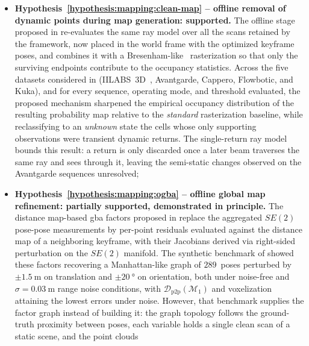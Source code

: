 \begin{itemize}
scan mode and from $89$ to $18$ nodes in local map mode once relocalization
is enabled. These results confirm that the back-end size follows the spatial
extent of the explored environment rather than the duration of the operation
or the path length;
\item \textbf{Hypothesis~\ref{hypothesis:mapping:clean-map} --
offline removal of dynamic points during map generation: supported.}
The offline stage proposed in  re-evaluates
the same ray model over all the scans retained by the framework, now placed
in the world frame with the optimized keyframe poses, and combines it with a
Bresenham-like~\cite{bresenham:ibm:1965,zingl:uas:2016} rasterization so that
only the surviving endpoints contribute to the occupancy statistics.
Across the five datasets considered in 
(IILABS~3D~\cite{ribeiro:access:2025}, Avantgarde, Cappero, Flowbotic, and
Kuka), and for every sequence, operating mode, and threshold evaluated, the
proposed mechanism sharpened the empirical occupancy distribution of the
resulting probability map relative to the \emph{standard} rasterization
baseline, while reclassifying to an \emph{unknown} state the cells whose only
supporting observations were transient dynamic returns.
The single-return ray model bounds this result: a return is only discarded
once a later beam traverses the same ray and sees through it, leaving the
semi-static changes observed on the Avantgarde sequences unresolved;
\item \textbf{Hypothesis~\ref{hypothesis:mapping:ogba} --
offline global map refinement: partially supported, demonstrated in
principle.}
The distance map-based \gls{gba} factors proposed in 
replace the aggregated $SE(2)$ pose-pose measurements by per-point residuals
evaluated against the distance map of a neighboring keyframe, with their
Jacobians derived via right-sided perturbation on the $SE(2)$ manifold.
The synthetic benchmark of  showed these factors
recovering a Manhattan-like graph of $289$~poses perturbed by
$\pm\SI{1.5}{\metre}$ on translation and $\pm\SI{20}{\degree}$ on
orientation, both under noise-free and $\sigma = \SI{0.03}{\metre}$ range
noise conditions, with $\mathcal{D}_\mathrm{p2p}(\mathcal{M}_1)$ and
voxelization attaining the lowest errors under noise.
However, that benchmark supplies the factor graph instead of building it:
the graph topology follows the ground-truth proximity between poses, each
variable holds a single clean scan of a static scene, and the point clouds

\end{itemize}
